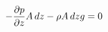 \documentclass[preview]{standalone}
\begin{document}
\begin{align*}
\special{dvisvgm:raw <g id='unique000'>}- \frac{\partial p}{\partial z} A\,dz - \rho A\,dz g =0\special{dvisvgm:raw </g>}
\end{align*}
\end{document}
